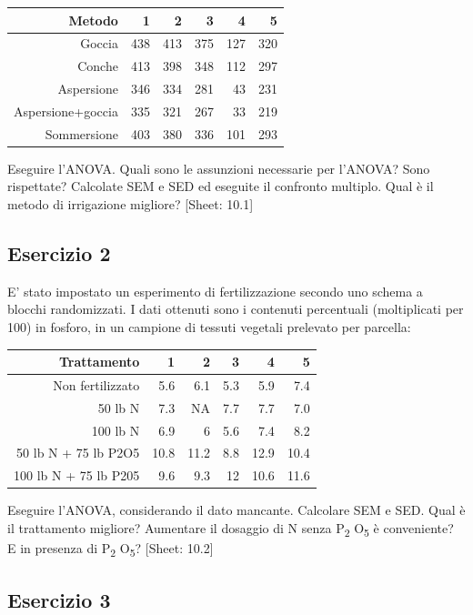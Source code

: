 \documentclass[a4paper,12pt,oneside]{book}
\begin{document}
\begin{longtable}[]{@{}rrrrrr@{}}
\toprule
Metodo & 1 & 2 & 3 & 4 & 5 \\
\midrule
\endhead
Goccia & 438 & 413 & 375 & 127 & 320 \\
Conche & 413 & 398 & 348 & 112 & 297 \\
Aspersione & 346 & 334 & 281 & 43 & 231 \\
Aspersione+goccia & 335 & 321 & 267 & 33 & 219 \\
Sommersione & 403 & 380 & 336 & 101 & 293 \\
\bottomrule
\end{longtable}

Eseguire l'ANOVA. Quali sono le assunzioni necessarie per l'ANOVA? Sono rispettate? Calcolate SEM e SED ed eseguite il confronto multiplo. Qual è il metodo di irrigazione migliore?
{[}Sheet: 10.1{]}

\hypertarget{esercizio-2-6}{%
\subsection{Esercizio 2}\label{esercizio-2-6}}

E' stato impostato un esperimento di fertilizzazione secondo uno schema a blocchi randomizzati. I dati ottenuti sono i contenuti percentuali (moltiplicati per 100) in fosforo, in un campione di tessuti vegetali prelevato per parcella:

\begin{longtable}[]{@{}rrrrrr@{}}
\toprule
Trattamento & 1 & 2 & 3 & 4 & 5 \\
\midrule
\endhead
Non fertilizzato & 5.6 & 6.1 & 5.3 & 5.9 & 7.4 \\
50 lb N & 7.3 & NA & 7.7 & 7.7 & 7.0 \\
100 lb N & 6.9 & 6 & 5.6 & 7.4 & 8.2 \\
50 lb N + 75 lb P2O5 & 10.8 & 11.2 & 8.8 & 12.9 & 10.4 \\
100 lb N + 75 lb P205 & 9.6 & 9.3 & 12 & 10.6 & 11.6 \\
\bottomrule
\end{longtable}

Eseguire l'ANOVA, considerando il dato mancante. Calcolare SEM e SED. Qual è il trattamento migliore? Aumentare il dosaggio di N senza P\textsubscript{2} O\textsubscript{5} è conveniente? E in presenza di P\textsubscript{2} O\textsubscript{5}?
{[}Sheet: 10.2{]}

\hypertarget{esercizio-3-6}{%
\subsection{Esercizio 3}\label{esercizio-3-6}}
\end{document}
